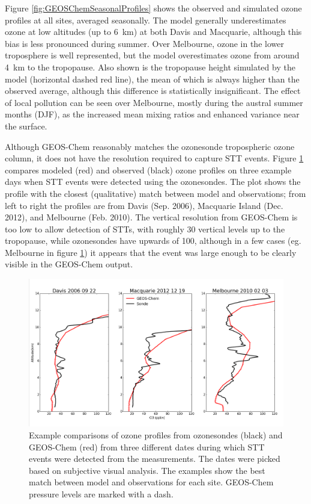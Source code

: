 \documentclass{article}
\begin{document}
  Figure \ref{fig:GEOSChemSeasonalProfiles} shows the observed and simulated ozone profiles at all sites, averaged seasonally.
  The model generally underestimates ozone at low altitudes (up to 6~km) at both Davis and Macquarie, although this bias is less pronounced during summer.
  Over Melbourne, ozone in the lower troposphere is well represented, but the model overestimates ozone from around 4~km to the tropopause.
  Also shown is the tropopause height simulated by the model (horizontal dashed red line), the mean of which is always higher than the observed average, although this difference is statistically insignificant.
  The effect of local pollution can be seen over Melbourne, mostly during the austral summer months (DJF), as the increased mean mixing ratios and enhanced variance near the surface.
  
  Although GEOS-Chem reasonably matches the ozonesonde tropospheric ozone column, it does not have the resolution required to capture STT events.
  Figure \ref{fig:event_profile_comparison} compares modeled (red) and observed (black) ozone profiles on three example days when STT events were detected using the ozonesondes. 
  The plot shows the profile with the closest (qualitative) match between model and observations; from left to right the profiles are from Davis (Sep. 2006), Macquarie Island (Dec. 2012), and Melbourne (Feb. 2010).
  The vertical resolution from GEOS-Chem is too low to allow detection of STTs, with roughly 30 vertical levels up to the tropopause, while ozonesondes have upwards of 100, although in a few cases (eg. Melbourne in figure \ref{fig:event_profile_comparison}) it appears that the event was large enough to be clearly visible in the GEOS-Chem output.
  
  \begin{figure}[!htbp]
    \includegraphics[width=\textwidth]{figures/event_profile_comparison.png}
    \caption{Example comparisons of ozone profiles from ozonesondes (black) and GEOS-Chem (red) from 		  three different dates during which STT events were detected from the measurements.
      The dates were picked based on subjective visual analysis. 
      The examples show the best match between model and observations for each site.
      GEOS-Chem pressure levels are marked with a dash.}
    \label{fig:event_profile_comparison}
  \end{figure}
  
\end{document}
